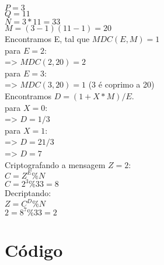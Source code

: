 \documentclass[a4paper,11pt]{article}
\theoremstyle{mytheor}
\begin{document}
$P = 3$\\
$Q = 11$\\
$N = 3 * 11 = 33$\\
$M = (3 - 1)(11 - 1) = 20$\\

Encontramos E, tal que $MDC(E, M) = 1$\\
para $E = 2$:\\
    => $MDC(2, 20) = 2$\\
para $E = 3$:\\
    => $MDC(3, 20) = 1$ (3 é coprimo a 20)\\

Encontramos $D = (1 + X*M) / E$.\\
para $X = 0$:\\
    => $D = 1 / 3$\\
para $X = 1$:\\
    => $D = 21 / 3$\\
    => $D = 7$\\

Criptografando a mensagem $Z = 2$:\\
$C = Z^E \% N$\\
$C = 2^3 \% 33 = 8$\\

Decriptando:\\
$Z = C^D \% N$\\
$2 = 8^7 \% 33 = 2$

\section*{Código}
\end{document}
